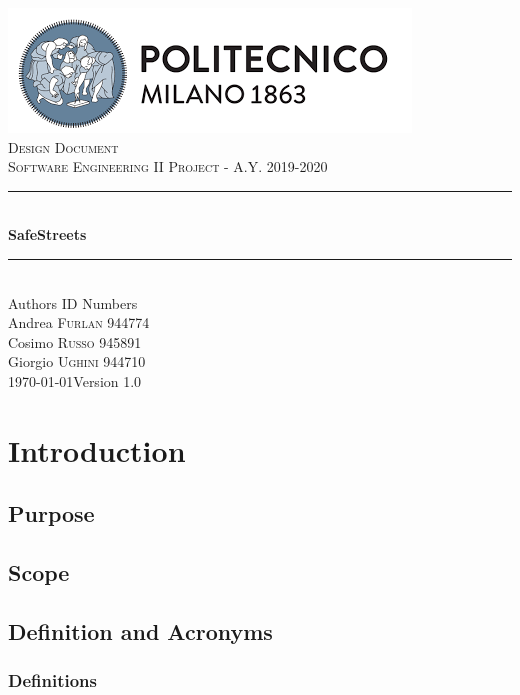 \documentclass[12pt]{article}
\begin{document}
	\begin{titlepage}
		\newcommand{\HRule}{\rule{\linewidth}{0.7mm}}
		\center
		\includegraphics{PolimiLogo.png}\\[1cm]
		
		\textsc{\LARGE Design Document}\\[1cm]
		\textsc{\large Software Engineering II Project - A.Y. 2019-2020}\\[1cm]
		\HRule \\[0.4cm]
		{ \huge \bfseries SafeStreets}\\[0.15cm]
		\HRule \\[1.5cm]
		{\large Authors  \hfill ID Numbers}\\[0.4cm]
		{\large Andrea \textsc{Furlan}  \hfill 944774}\\[0.2cm]
		{\large Cosimo \textsc{Russo}  \hfill 945891}\\[0.2cm]
		{\large Giorgio \textsc{Ughini} \hfill 944710}\\[2cm]
		{\large \today  \hfill Version 1.0}
		\vfill
	\end{titlepage}
\clearpage

{\hypersetup{hidelinks}\tableofcontents}
\clearpage

\section{Introduction}
\subsection{Purpose}


\subsection{Scope}

\clearpage

\subsection{Definition and Acronyms}
\subsubsection{Definitions}

\end{document}
